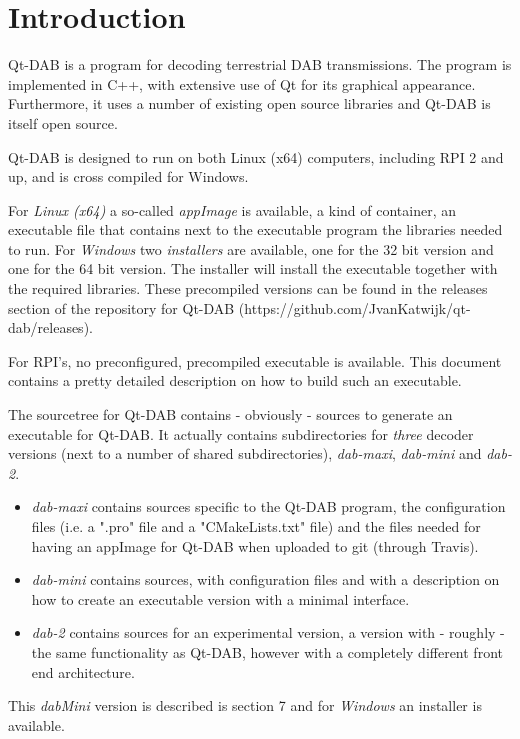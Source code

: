 \documentclass[12pt]{article}
\begin{document}
\section{Introduction}
Qt-DAB is a program for decoding terrestrial DAB transmissions.
The program is implemented in C++, with extensive use
of Qt for its graphical appearance. Furthermore, it uses a number of existing
open source libraries and Qt-DAB is itself open source.
\par
Qt-DAB is designed to run on both Linux (x64) computers, including
RPI 2 and up, and is cross compiled for Windows.
\par
For {\em Linux (x64)} a so-called {\em appImage} is available,
a kind of container,
an executable file that contains next to the executable program
the libraries needed to run.
For {\em Windows} two {\em installers} are available, one
for the 32 bit version and one for the 64 bit version.
The installer will install the executable together with the required libraries.
These precompiled versions can be found in the releases section of the
repository for Qt-DAB (https://github.com/JvanKatwijk/qt-dab/releases).
\par
For RPI's, no preconfigured, precompiled
executable is available. This document contains a
pretty detailed description on how to build such an executable.
\par
The sourcetree for Qt-DAB contains - obviously - sources to generate
an executable for Qt-DAB. It actually contains subdirectories for {\em three}
decoder versions (next to a number of shared subdirectories),
{\em dab-maxi}, {\em dab-mini} and {\em dab-2}.
\begin{itemize}
\item {\em dab-maxi} contains sources specific to the Qt-DAB program,
the configuration files (i.e. a ".pro" file and a "CMakeLists.txt" file)
and the files needed for having an appImage for Qt-DAB when uploaded to
git (through Travis).
\item {\em dab-mini} contains sources, with configuration files and with
a description on how to create an executable version with a minimal interface.
\item {\em dab-2} contains sources for an experimental version,
a version with - roughly - the same functionality as Qt-DAB, however with
a completely different front end architecture.
\end{itemize}
This {\em dabMini} version is described is section 7 and for {\em Windows}
an installer is available.
\par
\end{document}
